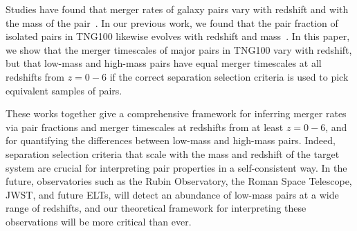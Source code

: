 \documentclass[twocolumn,linenumbers]{aastex631}
\begin{document}
    Studies have found that merger rates of galaxy pairs vary with redshift and with the mass of the pair~\citep{Stewart2009,Hopkins2010a,RG2015}.
    In our previous work, we found that the pair fraction of isolated pairs in TNG100 likewise evolves with redshift and mass~\citep{Chamberlain2024}. 
    In this paper, we show that the merger timescales of major pairs in TNG100 vary with redshift, but that low-mass and high-mass pairs have equal merger timescales at all redshifts from $z=0-6$ if the correct separation selection criteria is used to pick equivalent samples of pairs.
    
    These works together give a comprehensive framework for inferring merger rates via pair fractions and merger timescales at redshifts from at least $z=0-6$, and for quantifying the differences between low-mass and high-mass pairs.
    Indeed, separation selection criteria that scale with the mass and redshift of the target system are crucial for interpreting pair properties in a self-consistent way. 
    In the future, observatories such as the Rubin Observatory, the Roman Space Telescope, JWST, and future ELTs, will detect an abundance of low-mass pairs at a wide range of redshifts, and our theoretical framework for interpreting these observations will be more critical than ever. 


{}

\end{document}
